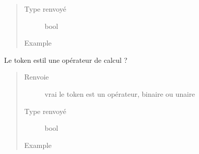 \documentclass[letterpaper,10pt,french]{sphinxmanual}
\begin{document}
\begin{fulllineitems}
\begin{fulllineitems}
\begin{quote}
\begin{description}
\item[{Type renvoyé}] \leavevmode
bool

\item[{Example}] \leavevmode
\begin{sphinxVerbatim}[commandchars=\\\{\}]
\end{sphinxVerbatim}

\end{description}\end{quote}

\end{fulllineitems}


\begin{fulllineitems}
\label{\detokenize{parsertokens:parsertokens.Token.isOperator}}
Le token est\sphinxhyphen{}il une opérateur de calcul ?
\begin{quote}\begin{description}
\item[{Renvoie}] \leavevmode
vrai le token est un opérateur, binaire ou unaire

\item[{Type renvoyé}] \leavevmode
bool

\item[{Example}] \leavevmode
\begin{sphinxVerbatim}[commandchars=\\\{\}]
\end{sphinxVerbatim}


\end{description}
\end{quote}
\end{fulllineitems}
\end{fulllineitems}
\end{document}
